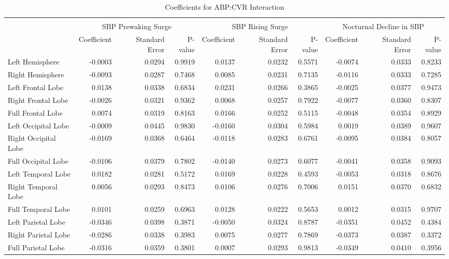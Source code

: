 \documentclass[10pt]{article}\usepackage[]{graphicx}\usepackage[]{color}
\begin{document}
\begin{landscape}
\begin{table}[ht]
\centering
\caption{Coefficients for ABP:CVR Interaction} 
\begin{tabular}{lrrrrrrrrr}
  \toprule
 &  \\ 
  & \multicolumn{3}{c}{SBP Prewaking Surge} & 
                      \multicolumn{3}{c}{SBP Rising Surge} & 
                      \multicolumn{3}{c}{Nocturnal Decline in SBP} \\ & Coefficient & Standard Error & P-value 
                        & Coefficient & Standard Error & P-value 
                        & Coefficient & Standard Error & P-value \\ \midrule
Left Hemisphere & -0.0003 & 0.0294 & 0.9919 & 0.0137 & 0.0232 & 0.5571 & -0.0074 & 0.0333 & 0.8233 \\ 
  Right Hemisphere & -0.0093 & 0.0287 & 0.7468 & 0.0085 & 0.0231 & 0.7135 & -0.0116 & 0.0333 & 0.7285 \\ 
  Left Frontal Lobe & 0.0138 & 0.0338 & 0.6834 & 0.0231 & 0.0266 & 0.3865 & -0.0025 & 0.0377 & 0.9473 \\ 
  Right Frontal Lobe & -0.0026 & 0.0321 & 0.9362 & 0.0068 & 0.0257 & 0.7922 & -0.0077 & 0.0360 & 0.8307 \\ 
  Full Frontal Lobe & 0.0074 & 0.0319 & 0.8163 & 0.0166 & 0.0252 & 0.5115 & -0.0048 & 0.0354 & 0.8929 \\ 
  Left Occipital Lobe & -0.0009 & 0.0445 & 0.9830 & -0.0160 & 0.0304 & 0.5984 & 0.0019 & 0.0389 & 0.9607 \\ 
  Right Occipital Lobe & -0.0169 & 0.0368 & 0.6464 & -0.0118 & 0.0283 & 0.6761 & -0.0095 & 0.0384 & 0.8057 \\ 
  Full Occipital Lobe & -0.0106 & 0.0379 & 0.7802 & -0.0140 & 0.0273 & 0.6077 & -0.0041 & 0.0358 & 0.9093 \\ 
  Left Temporal Lobe & 0.0182 & 0.0281 & 0.5172 & 0.0169 & 0.0228 & 0.4593 & -0.0053 & 0.0318 & 0.8676 \\ 
  Right Temporal Lobe & 0.0056 & 0.0293 & 0.8473 & 0.0106 & 0.0276 & 0.7006 & 0.0151 & 0.0370 & 0.6832 \\ 
  Full Temporal Lobe & 0.0101 & 0.0259 & 0.6963 & 0.0128 & 0.0222 & 0.5653 & 0.0012 & 0.0315 & 0.9707 \\ 
  Left Parietal Lobe & -0.0346 & 0.0398 & 0.3871 & -0.0050 & 0.0324 & 0.8787 & -0.0351 & 0.0452 & 0.4384 \\ 
  Right Parietal Lobe & -0.0286 & 0.0338 & 0.3983 & 0.0075 & 0.0277 & 0.7869 & -0.0373 & 0.0387 & 0.3372 \\ 
  Full Parietal Lobe & -0.0316 & 0.0359 & 0.3801 & 0.0007 & 0.0293 & 0.9813 & -0.0349 & 0.0410 & 0.3956 \\ 
   \bottomrule
\end{tabular}
\end{table}

\end{landscape}
\end{document}
